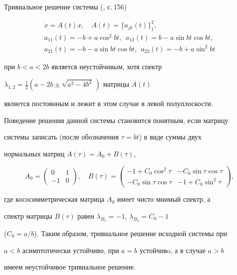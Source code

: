 \begin{exam}


Тривиальное решение системы (\cite{4}, с.\,156)


\begin{gather*}


\Dot x=A(t)x,\quad A(t)=\{a_{j k}(t)\}^2_1,\\


a_{11}(t)=-b+a\cos^2b t,\ \ a_{12}(t)=b-a\sin b t\cos b t,\\


a_{21}(t)=-b-a\sin b t\cos b t,


\ \ a_{22}(t)=-b+a\sin^2 b t


\end{gather*}


при $b<a<2b$ является неустойчивым, хотя спектр 


$\lambda_{1,2}=\frac{1}{2}(a-2b \pm\sqrt{a^2-4b^2}\,)$ матрицы $A(t)$ 


является постоянным и лежит в этом случае в левой полуплоскости. 


Поведение решения данной системы становится понятным, если матрицу 


системы записать (после обозначения $\tau= b t$) в виде суммы двух 


нормальных матриц $A(\tau)=A_0+B(\tau)$,


$$


A_0=


\begin{pmatrix}


0 & 1 \\ -1 & 0


\end{pmatrix}


,\quad B(\tau)=


\begin{pmatrix}


-1+C_0\cos^2\tau & -C_0\sin\tau\cos\tau \\


-C_0\sin\tau\cos\tau & -1+C_0\sin^2\tau


\end{pmatrix}


,


$$


где кососимметрическая матрица $A_0$ имеет чисто мнимый спектр, а 


спектр матрицы $B(\tau)$ равен $\lambda_{B_1}=-1$, $\lambda_{B_2}=C_0-1$ 


($C_0=a/b$). Таким образом, тривиальное решение исходной системы при 


$a<b$ асимптотически устойчиво, при $a=b$ устойчивo, а в случае $a>b$ 


имеем неустойчивое тривиальное решение.


\end{exam}





